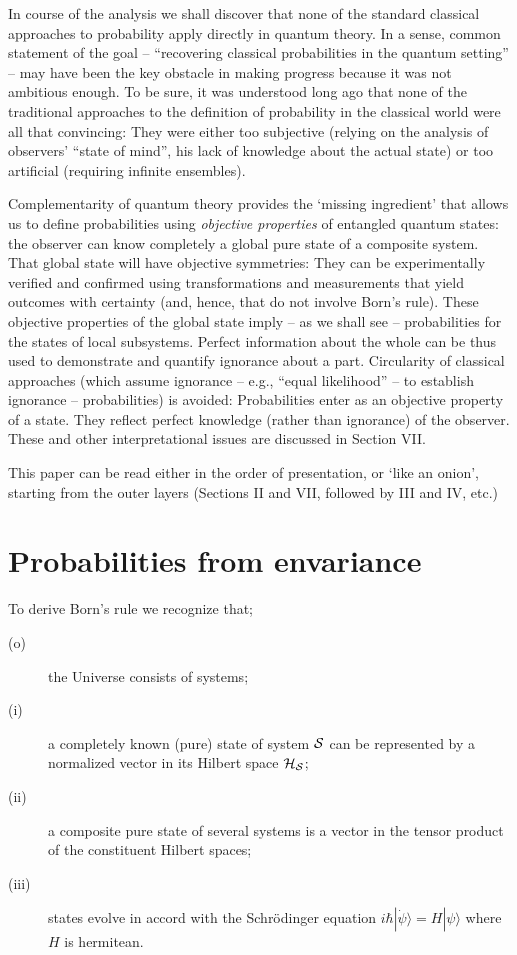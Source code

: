 \documentclass[aps,pra,epsfig,11pt,floatfix]{revtex4}
\begin{document}
In course of the analysis we shall discover that none of the standard classical
approaches to probability apply directly in quantum theory. In a sense,  common
statement of the goal -- ``recovering classical probabilities in the quantum
setting'' -- may have been the key obstacle in making progress because it
was not ambitious enough. To be sure, it was understood long ago that none of
the traditional approaches to the definition of probability in the classical
world were all that convincing: They were either too subjective (relying
on the analysis of observers'  ``state of mind'', his lack of knowledge 
about the actual state) or too artificial (requiring infinite ensembles).

Complementarity of quantum theory provides the `missing ingredient' that
allows us to define probabilities using {\it objective properties} of entangled 
quantum states: the observer can know completely a global pure state of 
a composite system. That global state will have objective symmetries: They can be
experimentally verified and confirmed using transformations and measurements
that yield outcomes with certainty (and, hence, that do not involve Born's rule).
These objective properties of the global state imply -- as we shall see --
probabilities for the states of  local subsystems. Perfect information about the whole
can be thus used to demonstrate and quantify ignorance about a part. Circularity
of classical approaches (which assume ignorance -- e.g., ``equal likelihood'' -- to
establish ignorance -- probabilities) is avoided: Probabilities enter as an objective
property of a state. They reflect perfect knowledge (rather than ignorance) of 
the observer. These and other interpretational issues are discussed
in Section VII.

This paper can be read either in the order of presentation, or `like an onion',
starting from the outer layers (Sections II and VII, followed by III and IV, etc.)

\section{Probabilities from envariance}

To derive Born's rule we recognize that;
\begin{description}
\item[(o)] the Universe consists of systems;
\item[(i)] a completely known (pure) state of system ${\cal S}$ can
be represented by  a normalized vector in its Hilbert space ${\cal H_S}$;
\item[(ii)] a composite pure state of several systems is a vector
in the tensor product of the constituent Hilbert spaces;
\item[(iii)] states evolve in accord with the Schr\"odinger
equation $i \hbar |\dot \psi \rangle = H |\psi\rangle$ where $H$ is hermitean.
\end{description}
\end{document}
